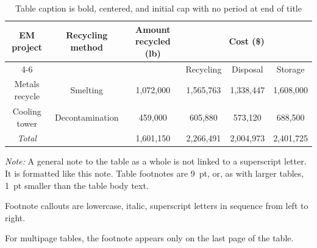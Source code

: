 \documentclass[tm]{ornltm} %
\begin{document}
\begin{table}[ht]
  \centering
  \begin{threeparttable}
  \caption{Table caption is bold, centered, and initial cap with no period at
  end of title}\label{tab:1}
  \newcommand\tworow[1]{\multirow{2}{*}{#1}}
  \begin{tabular}{c c c c c c}
    \toprule
    \tworow{EM project\tnote{a}} & \tworow{Recycling method} & \tworow{Amount
    recycled (lb)} & \multicolumn{3}{c}{Cost (\$)} \\ \cline{4-6}
    &  &  & Recycling & Disposal &  Storage \\ \midrule
    Metals recycle & Smelting & 1,072,000 & 1,565,763 & 1,338,447 & 1,608,000 \\
    Cooling tower\tnote{b} & Decontamination & 459,000 & 605,880 & 573,120 &
    688,500  \\
    \em{Total} &   & 1,601,150 & 2,266,491 & 2,004,973 & 2,401,725 \\
    \bottomrule
  \end{tabular}
  \begin{tablenotes}
    \item \emph{Note:} A general note to the table as a whole is not linked to
    a superscript letter. It is formatted like this note. Table footnotes are
    9~pt, or, as with larger tables, 1~pt smaller than the table body text.
  \item[a] Footnote callouts are lowercase, italic, superscript letters in
    sequence from left to right.
  \item[b] For multipage tables, the footnote appears only on the last page of
    the table.
  \end{tablenotes}
  \end{threeparttable}
\end{table}
\end{document}
